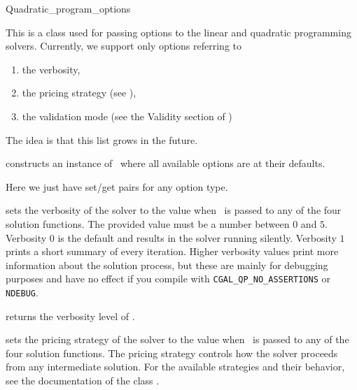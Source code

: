 \begin{ccRefClass}{Quadratic_program_options}


\ccDefinition
This is a class used for passing options to the linear and
quadratic programming solvers. Currently, we support only
options referring to
\begin{enumerate}
\item the verbosity, 
\item the pricing strategy (see ),
\item the validation mode (see the Validity section of
)
\end{enumerate}
The idea is that this list grows in the future.

\ccCreation
\ccIndexClassCreation
{}

{constructs an instance of \ccRefName\ where all available options
are at their defaults.}

\ccOperations
Here we just have set/get pairs for any option type.


{sets the verbosity of the solver to the value  when
\ccVar\ is passed to any of the four solution functions. The provided
value must be a number between $0$ and $5$. Verbosity $0$ is the default and
results in the solver running silently. Verbosity $1$ prints a short
summary of every iteration. Higher verbosity values print more information
about the solution process, but these are mainly for debugging 
purposes and have no effect if you compile with 
\texttt{CGAL\_QP\_NO\_ASSERTIONS} or \texttt{NDEBUG}.}

{returns the verbosity level of \ccVar.}


{sets the pricing strategy of the solver to the value 
when \ccVar\ is passed to any of the four solution functions. The pricing
strategy controls how the solver proceeds from any intermediate solution.
For the available strategies and their behavior, see the documentation of the 
class .}


\end{ccRefClass}
